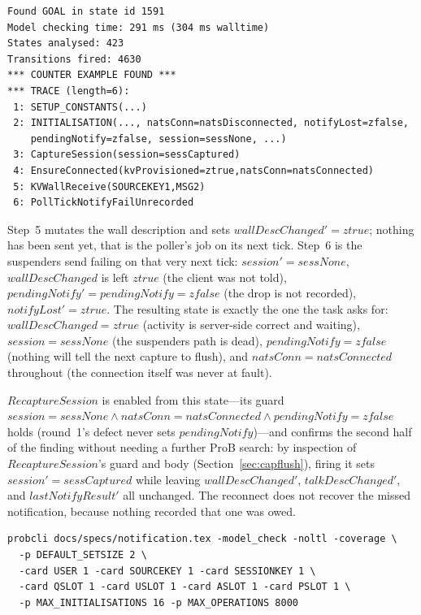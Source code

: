 \documentclass[a4paper,10pt,fleqn]{article}
\begin{document}
\begin{verbatim}
Found GOAL in state id 1591
Model checking time: 291 ms (304 ms walltime)
States analysed: 423
Transitions fired: 4630
*** COUNTER EXAMPLE FOUND ***
*** TRACE (length=6):
 1: SETUP_CONSTANTS(...)
 2: INITIALISATION(..., natsConn=natsDisconnected, notifyLost=zfalse,
    pendingNotify=zfalse, session=sessNone, ...)
 3: CaptureSession(session=sessCaptured)
 4: EnsureConnected(kvProvisioned=ztrue,natsConn=natsConnected)
 5: KVWallReceive(SOURCEKEY1,MSG2)
 6: PollTickNotifyFailUnrecorded
\end{verbatim}

Step~5 mutates the wall description and sets $wallDescChanged' =
ztrue$; nothing has been sent yet, that is the poller's job on its
next tick.  Step~6 is the suspenders send failing on that very next
tick: $session' = sessNone$, $wallDescChanged$ is left $ztrue$ (the
client was not told), $pendingNotify' = pendingNotify = zfalse$ (the
drop is not recorded), $notifyLost' = ztrue$.  The resulting state is
exactly the one the task asks for: $wallDescChanged = ztrue$ (activity
is server-side correct and waiting), $session = sessNone$ (the
suspenders path is dead), $pendingNotify = zfalse$ (nothing will tell
the next capture to flush), and $natsConn = natsConnected$ throughout
(the connection itself was never at fault).

$RecaptureSession$ is enabled from this state---its guard $session =
sessNone \land natsConn = natsConnected \land pendingNotify = zfalse$
holds (round~1's defect never sets $pendingNotify$)---and confirms the
second half of the finding without needing a further ProB search: by
inspection of $RecaptureSession$'s guard and body
(Section~\ref{sec:capflush}), firing it sets $session' = sessCaptured$
while leaving $wallDescChanged'$, $talkDescChanged'$, and
$lastNotifyResult'$ all unchanged.  The reconnect does not recover the
missed notification, because nothing recorded that one was owed.

\begin{verbatim}
probcli docs/specs/notification.tex -model_check -noltl -coverage \
  -p DEFAULT_SETSIZE 2 \
  -card USER 1 -card SOURCEKEY 1 -card SESSIONKEY 1 \
  -card QSLOT 1 -card USLOT 1 -card ASLOT 1 -card PSLOT 1 \
  -p MAX_INITIALISATIONS 16 -p MAX_OPERATIONS 8000
\end{verbatim}
\end{document}
